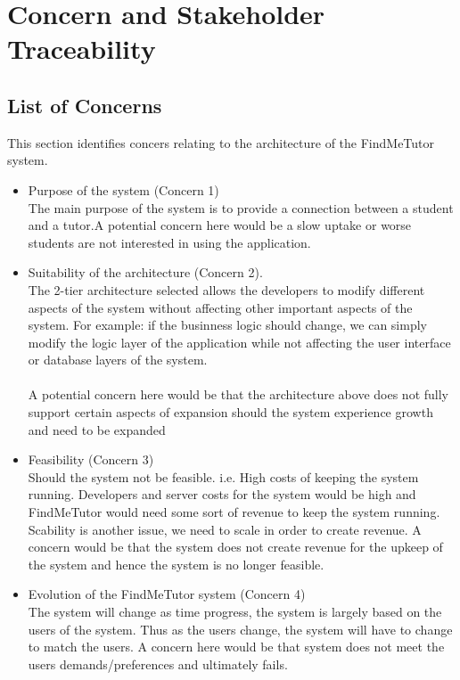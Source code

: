 \documentclass[12pt]{article}
\begin{document}
\section{Concern and Stakeholder Traceability}
\subsection{List of Concerns}
This section identifies concers relating to the architecture of the FindMeTutor system.
\begin{itemize}
\item{Purpose of the system (Concern 1)}\\
The main purpose of the system is to provide a connection between a student and a tutor.A potential concern here would be a slow uptake or worse students are not interested in using the application.

\item Suitability of the architecture (Concern 2).\\
The 2-tier architecture selected allows the developers to modify different aspects of the system without affecting other important aspects of the system. For example: if the businness logic should change, we can simply modify the logic layer of the application while not affecting the user interface or database layers of the system.\\\\A potential concern here would be that the architecture above does not fully support certain aspects of expansion should the system experience growth and need to be expanded

\item Feasibility (Concern 3)\\
Should the system not be feasible. i.e. High costs of keeping the system running. Developers and server costs for the system would be high and FindMeTutor would need some sort of revenue to keep the system running. Scability is another issue, we need to scale in order to create revenue. A concern would be that the system does not create revenue for the upkeep of the system and hence the system is no longer feasible.

\item Evolution of the FindMeTutor system (Concern 4)\\
The system will change as time progress, the system is largely based on the users of the system. Thus as the users change, the system will have to change to match the users. A concern here would be that system does not meet the users demands/preferences and ultimately fails.


\end{itemize}
\end{document}
